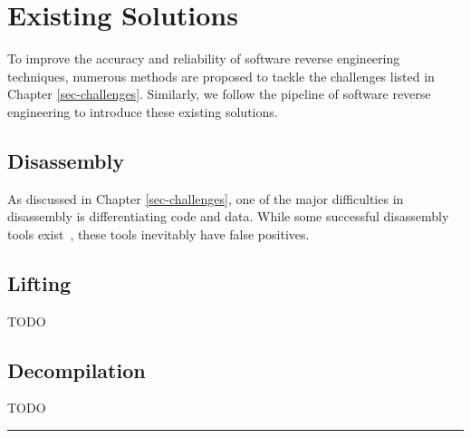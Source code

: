 \chapter{Existing Solutions}\label{sec-existing-solutions}

To improve the accuracy and reliability of software reverse engineering techniques, numerous methods are proposed to tackle the challenges listed in Chapter \ref{sec-challenges}.
Similarly, we follow the pipeline of software reverse engineering to introduce these existing solutions.

\section{Disassembly} \label{sec:existing-disassembly}
As discussed in Chapter \ref{sec-challenges}, one of the major difficulties in disassembly is differentiating code and data. While some successful disassembly tools exist~\cite{hex2014ida,kvroustek2017retdec,ghidra,radare}, these tools inevitably have false positives.

\section{Lifting} \label{sec:existing-lifting}
TODO

\section{Decompilation} \label{sec:existing-decompilation}
TODO


\noindent\rule{8cm}{0.4pt}

\newpage
